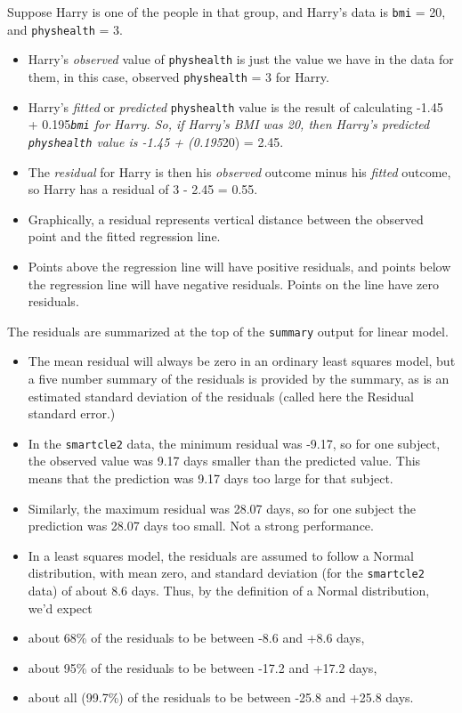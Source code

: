 \documentclass[]{book}
\providecommand{\tightlist}{%
  \setlength{\itemsep}{0pt}\setlength{\parskip}{0pt}}
\theoremstyle{definition}
\theoremstyle{definition}
\theoremstyle{definition}
\theoremstyle{remark}
\begin{document}
Suppose Harry is one of the people in that group, and Harry's data is
\texttt{bmi} = 20, and \texttt{physhealth} = 3.

\begin{itemize}
\tightlist
\item
  Harry's \emph{observed} value of \texttt{physhealth} is just the value
  we have in the data for them, in this case, observed
  \texttt{physhealth} = 3 for Harry.
\item
  Harry's \emph{fitted} or \emph{predicted} \texttt{physhealth} value is
  the result of calculating -1.45 + 0.195\emph{\texttt{bmi} for Harry.
  So, if Harry's BMI was 20, then Harry's predicted \texttt{physhealth}
  value is -1.45 + (0.195}20) = 2.45.
\item
  The \emph{residual} for Harry is then his \emph{observed} outcome
  minus his \emph{fitted} outcome, so Harry has a residual of 3 - 2.45 =
  0.55.
\item
  Graphically, a residual represents vertical distance between the
  observed point and the fitted regression line.
\item
  Points above the regression line will have positive residuals, and
  points below the regression line will have negative residuals. Points
  on the line have zero residuals.
\end{itemize}

The residuals are summarized at the top of the \texttt{summary} output
for linear model.

\begin{itemize}
\tightlist
\item
  The mean residual will always be zero in an ordinary least squares
  model, but a five number summary of the residuals is provided by the
  summary, as is an estimated standard deviation of the residuals
  (called here the Residual standard error.)
\item
  In the \texttt{smartcle2} data, the minimum residual was -9.17, so for
  one subject, the observed value was 9.17 days smaller than the
  predicted value. This means that the prediction was 9.17 days too
  large for that subject.
\item
  Similarly, the maximum residual was 28.07 days, so for one subject the
  prediction was 28.07 days too small. Not a strong performance.
\item
  In a least squares model, the residuals are assumed to follow a Normal
  distribution, with mean zero, and standard deviation (for the
  \texttt{smartcle2} data) of about 8.6 days. Thus, by the definition of
  a Normal distribution, we'd expect
\item
  about 68\% of the residuals to be between -8.6 and +8.6 days,
\item
  about 95\% of the residuals to be between -17.2 and +17.2 days,
\item
  about all (99.7\%) of the residuals to be between -25.8 and +25.8
  days.
\end{itemize}
\end{document}
